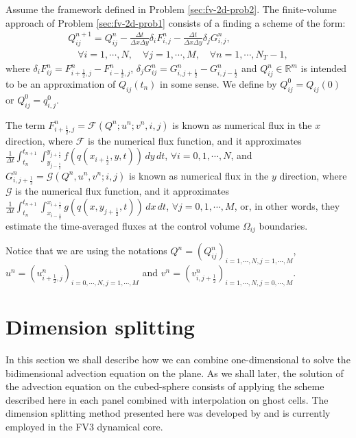 \begin{prob}[2D-FV scheme]
	\label{sec:fv-2d-prob3}
	Assume the framework defined in Problem \ref{sec:fv-2d-prob2}.
	The finite-volume approach of Problem \ref{sec:fv-2d-prob1}
	consists of a finding a scheme of the form:
	\begin{align*}
		{Q}_{ij}^{n+1} =  {Q}_{ij}^{n} -
		\frac{\Delta t}{\Delta x \Delta y} 
        \delta_i {F}_{i,j}^{n} - 
		\frac{\Delta t}{\Delta x \Delta y}
        \delta_j {G}_{i,j}^{n},
		\\ \nonumber \quad \forall i = 1, \cdots, N, \quad \forall j = 1, \cdots, M,
		\quad \forall n = 1, \cdots, N_T-1,
	\end{align*}
	where $ \delta_i F_{ij}^n =
    {F}_{i+\frac{1}{2},j}^{n} 
    - {F}_{i-\frac{1}{2},j}^{n}$,
    $ \delta_j G_{ij}^n =
    {G}_{i,j+\frac{1}{2}}^{n} 
    - {G}_{i,j-\frac{1}{2}}^{n}$ 
    and ${Q}_{ij}^{n} \in \mathbb{R}^m$ is intended to be an approximation
	of ${Q}_{ij}(t_{n})$ in some sense. We define by ${Q}_{ij}^{0} = {Q}_{ij}(0)$ or
	${Q}_{ij}^{0} = {q}^0_{i,j}$.
    
    The term ${F}_{i+\frac{1}{2}, j}^{n} = {\mathcal{F}}
    (Q^n; u^n; v^n, i,j)
    $ is known as numerical flux in the 
    $x$ direction, where $\mathcal{F}$ is the numerical flux function, 
    and it approximates
	$\frac{1}{\Delta t}\int_{t_n}^{t_{n+1}} 
    \int_{y_{j-\frac{1}{2}}}^{y_{j+\frac{1}{2}}} 
    {f}({q}(x_{i+\frac{1}{2}}, y, t)) \,dy \,dt $,
    $\forall i = 0, 1, \cdots, N$,
    and 
	${G}_{i, j+\frac{1}{2}}^{n} = 
    {\mathcal{G}} (Q^n, u^n, v^n; i, j)$ 
    is known as numerical flux in the 
    $y$ direction, where $\mathcal{G}$ 
    is the numerical flux function, and it approximates
	$\frac{1}{\Delta t}\int_{t_n}^{t_{n+1}}  
    \int_{x_{i-\frac{1}{2}}}^{x_{i+\frac{1}{2}}}
    {g}({q}(x, y_{j+\frac{1}{2}}, t)) \,dx \,dt $,
    $\forall j = 0, 1, \cdots, M$,
	or, in other words, they estimate the time-averaged
    fluxes at the control volume $\Omega_{ij}$ boundaries.
\end{prob}
Notice that we are using the notations $Q^n = (Q_{ij}^n)_{i=1,\cdots, N, j = 1, \cdots, M}$,
$u^n = (u_{i+\frac{1}{2},j}^n)_{i=0,\cdots, N, j = 1, \cdots, M}$
and $v^n = (v_{i,j+\frac{1}{2}}^n)_{i=1,\cdots, N, j = 0, \cdots, M}$.

\section{Dimension splitting}
\label{sec-dimsplit}
In this section we shall describe how we can combine one-dimensional
to solve the bidimensional advection equation on the plane.
As we shall later, the solution of the advection
equation on the cubed-sphere consists of applying the scheme described here in each
panel combined with interpolation on ghost cells.
The dimension splitting method presented here was developed by \citet{lin:1996}
and is currently employed in the FV3 dynamical core.

